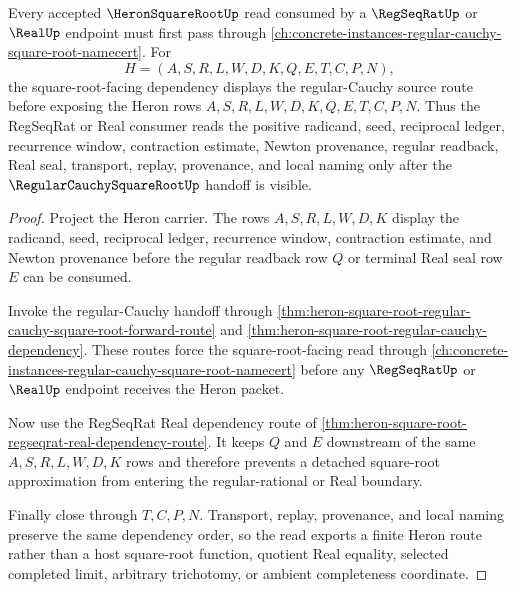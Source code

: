 \begin{theorem}
\label{thm:heron-square-root-regseqrat-forward-dependency}
Every accepted $\HeronSquareRootUp$ read consumed by a $\RegSeqRatUp$ or $\RealUp$ endpoint must first pass through \autoref{ch:concrete-instances-regular-cauchy-square-root-namecert}. For
$$
H=(A,S,R,L,W,D,K,Q,E,T,C,P,N),
$$
the square-root-facing dependency displays the regular-Cauchy source route before exposing the Heron rows $A,S,R,L,W,D,K,Q,E,T,C,P,N$. Thus the RegSeqRat or Real consumer reads the positive radicand, seed, reciprocal ledger, recurrence window, contraction estimate, Newton provenance, regular readback, Real seal, transport, replay, provenance, and local naming only after the $\RegularCauchySquareRootUp$ handoff is visible.
\end{theorem}
\begin{proof}
Project the Heron carrier. The rows $A,S,R,L,W,D,K$ display the radicand, seed, reciprocal ledger, recurrence window, contraction estimate, and Newton provenance before the regular readback row $Q$ or terminal Real seal row $E$ can be consumed.

Invoke the regular-Cauchy handoff through \autoref{thm:heron-square-root-regular-cauchy-square-root-forward-route} and \autoref{thm:heron-square-root-regular-cauchy-dependency}. These routes force the square-root-facing read through \autoref{ch:concrete-instances-regular-cauchy-square-root-namecert} before any $\RegSeqRatUp$ or $\RealUp$ endpoint receives the Heron packet.

Now use the RegSeqRat Real dependency route of \autoref{thm:heron-square-root-regseqrat-real-dependency-route}. It keeps $Q$ and $E$ downstream of the same $A,S,R,L,W,D,K$ rows and therefore prevents a detached square-root approximation from entering the regular-rational or Real boundary.

Finally close through $T,C,P,N$. Transport, replay, provenance, and local naming preserve the same dependency order, so the read exports a finite Heron route rather than a host square-root function, quotient Real equality, selected completed limit, arbitrary trichotomy, or ambient completeness coordinate.
\end{proof}
